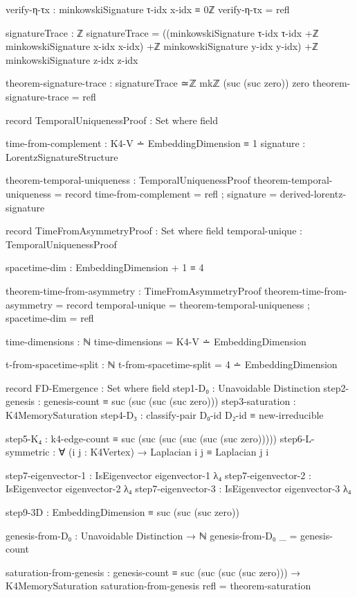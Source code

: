 \documentclass[11pt,a4paper]{book}
\begin{document}
\begin{code}
verify-η-τx : minkowskiSignature τ-idx x-idx ≡ 0ℤ
verify-η-τx = refl

signatureTrace : ℤ
signatureTrace = ((minkowskiSignature τ-idx τ-idx +ℤ 
                   minkowskiSignature x-idx x-idx) +ℤ
                   minkowskiSignature y-idx y-idx) +ℤ
                   minkowskiSignature z-idx z-idx

theorem-signature-trace : signatureTrace ≃ℤ mkℤ (suc (suc zero)) zero
theorem-signature-trace = refl

record TemporalUniquenessProof : Set where
  field

    time-from-complement : K4-V ∸ EmbeddingDimension ≡ 1
    signature : LorentzSignatureStructure
    
theorem-temporal-uniqueness : TemporalUniquenessProof
theorem-temporal-uniqueness = record 
  { time-from-complement = refl
  ; signature = derived-lorentz-signature
  }

record TimeFromAsymmetryProof : Set where
  field
    temporal-unique : TemporalUniquenessProof

    spacetime-dim : EmbeddingDimension + 1 ≡ 4

theorem-time-from-asymmetry : TimeFromAsymmetryProof
theorem-time-from-asymmetry = record
  { temporal-unique = theorem-temporal-uniqueness
  ; spacetime-dim = refl
  }

time-dimensions : ℕ
time-dimensions = K4-V ∸ EmbeddingDimension


t-from-spacetime-split : ℕ
t-from-spacetime-split = 4 ∸ EmbeddingDimension

record FD-Emergence : Set where
  field
    step1-D₀          : Unavoidable Distinction
    step2-genesis     : genesis-count ≡ suc (suc (suc (suc zero)))
    step3-saturation  : K4MemorySaturation
    step4-D₃          : classify-pair D₀-id D₂-id ≡ new-irreducible
    
    step5-K₄          : k4-edge-count ≡ suc (suc (suc (suc (suc (suc zero)))))
    step6-L-symmetric : ∀ (i j : K4Vertex) → Laplacian i j ≡ Laplacian j i
    
    step7-eigenvector-1 : IsEigenvector eigenvector-1 λ₄
    step7-eigenvector-2 : IsEigenvector eigenvector-2 λ₄
    step7-eigenvector-3 : IsEigenvector eigenvector-3 λ₄
    
    step9-3D          : EmbeddingDimension ≡ suc (suc (suc zero))

genesis-from-D₀ : Unavoidable Distinction → ℕ
genesis-from-D₀ _ = genesis-count

saturation-from-genesis : genesis-count ≡ suc (suc (suc (suc zero))) → K4MemorySaturation
saturation-from-genesis refl = theorem-saturation


\end{code}
\end{document}
